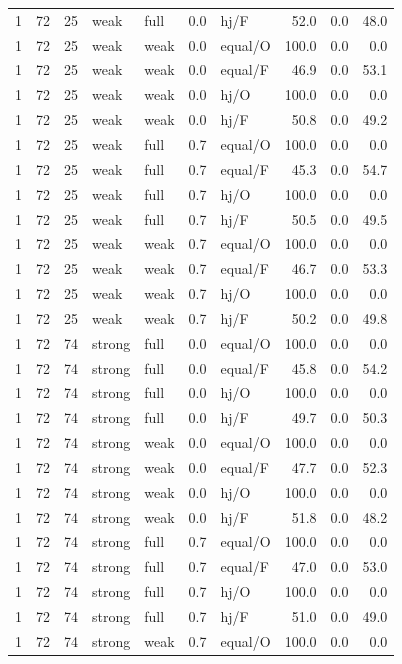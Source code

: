 {\begin{longtable}{@{}rrrllllrrr@{}}
1 & 72 & 25 & weak & full & 0.0 & hj/F & 52.0 & 0.0 & 48.0\\
1 & 72 & 25 & weak & weak & 0.0 & equal/O & 100.0 & 0.0 & 0.0\\
1 & 72 & 25 & weak & weak & 0.0 & equal/F & 46.9 & 0.0 & 53.1\\
1 & 72 & 25 & weak & weak & 0.0 & hj/O & 100.0 & 0.0 & 0.0\\
1 & 72 & 25 & weak & weak & 0.0 & hj/F & 50.8 & 0.0 & 49.2\\
1 & 72 & 25 & weak & full & 0.7 & equal/O & 100.0 & 0.0 & 0.0\\
1 & 72 & 25 & weak & full & 0.7 & equal/F & 45.3 & 0.0 & 54.7\\
1 & 72 & 25 & weak & full & 0.7 & hj/O & 100.0 & 0.0 & 0.0\\
1 & 72 & 25 & weak & full & 0.7 & hj/F & 50.5 & 0.0 & 49.5\\
1 & 72 & 25 & weak & weak & 0.7 & equal/O & 100.0 & 0.0 & 0.0\\
1 & 72 & 25 & weak & weak & 0.7 & equal/F & 46.7 & 0.0 & 53.3\\
1 & 72 & 25 & weak & weak & 0.7 & hj/O & 100.0 & 0.0 & 0.0\\
1 & 72 & 25 & weak & weak & 0.7 & hj/F & 50.2 & 0.0 & 49.8\\
1 & 72 & 74 & strong & full & 0.0 & equal/O & 100.0 & 0.0 & 0.0\\
1 & 72 & 74 & strong & full & 0.0 & equal/F & 45.8 & 0.0 & 54.2\\
1 & 72 & 74 & strong & full & 0.0 & hj/O & 100.0 & 0.0 & 0.0\\
1 & 72 & 74 & strong & full & 0.0 & hj/F & 49.7 & 0.0 & 50.3\\
1 & 72 & 74 & strong & weak & 0.0 & equal/O & 100.0 & 0.0 & 0.0\\
1 & 72 & 74 & strong & weak & 0.0 & equal/F & 47.7 & 0.0 & 52.3\\
1 & 72 & 74 & strong & weak & 0.0 & hj/O & 100.0 & 0.0 & 0.0\\
1 & 72 & 74 & strong & weak & 0.0 & hj/F & 51.8 & 0.0 & 48.2\\
1 & 72 & 74 & strong & full & 0.7 & equal/O & 100.0 & 0.0 & 0.0\\
1 & 72 & 74 & strong & full & 0.7 & equal/F & 47.0 & 0.0 & 53.0\\
1 & 72 & 74 & strong & full & 0.7 & hj/O & 100.0 & 0.0 & 0.0\\
1 & 72 & 74 & strong & full & 0.7 & hj/F & 51.0 & 0.0 & 49.0\\
1 & 72 & 74 & strong & weak & 0.7 & equal/O & 100.0 & 0.0 & 0.0\\

\end{longtable}}

